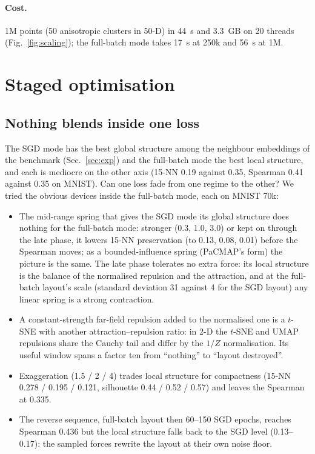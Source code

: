 \documentclass[11pt]{article}
\begin{document}
\paragraph{Cost.} 1M points (50 anisotropic clusters in 50-D) in 44~s and 3.3~GB on 20 threads
(Fig.~\ref{fig:scaling}); the full-batch mode takes 17~s at 250k and 56~s at 1M.

\section{Staged optimisation}\label{sec:staged}
\subsection{Nothing blends inside one loss}
The SGD mode has the best global structure among the neighbour embeddings of the benchmark
(Sec.~\ref{sec:exp}) and the full-batch mode the best local structure, and each is mediocre on the other
axis (15-NN 0.19 against 0.35, Spearman 0.41 against 0.35 on MNIST). Can one loss fade from one regime
to the other? We tried the obvious devices inside the full-batch mode, each on MNIST 70k:
\begin{itemize}[leftmargin=1.5em]
\item The mid-range spring that gives the SGD mode its global structure does nothing for the full-batch
  mode: stronger (0.3, 1.0, 3.0) or kept on through the late phase, it lowers 15-NN preservation (to
  0.13, 0.08, 0.01) before the Spearman moves; as a bounded-influence spring (PaCMAP's form) the picture
  is the same. The late phase tolerates no extra force: its local structure is the balance of the
  normalised repulsion and the attraction, and at the full-batch layout's scale (standard deviation 31
  against 4 for the SGD layout) any linear spring is a strong contraction.
\item A constant-strength far-field repulsion added to the normalised one is a $t$-SNE with another
  attraction--repulsion ratio: in 2-D the $t$-SNE and UMAP repulsions share the Cauchy tail and differ by
  the $1/Z$ normalisation. Its useful window spans a factor ten from ``nothing'' to ``layout destroyed''.
\item Exaggeration (1.5 / 2 / 4) trades local structure for compactness (15-NN 0.278 / 0.195 / 0.121,
  silhouette 0.44 / 0.52 / 0.57) and leaves the Spearman at 0.335.
\item The reverse sequence, full-batch layout then 60--150 SGD epochs, reaches Spearman 0.436 but the
  local structure falls back to the SGD level (0.13--0.17): the sampled forces rewrite the layout at
  their own noise floor.
\end{itemize}
\end{document}
